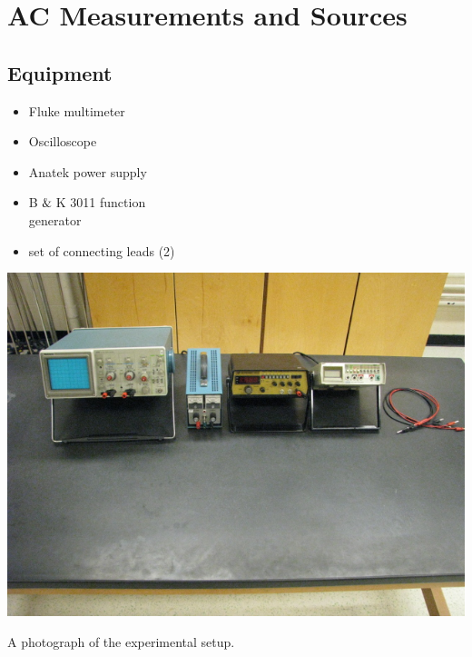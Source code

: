 




\chapter{AC Measurements and Sources}

\section{{\bf Equipment}}

\begin{minipage}[t]{0.55\textwidth}
\begin{itemize}[noitemsep]
\item Fluke multimeter
\item Oscilloscope
\item Anatek power supply
\end{itemize}
\end{minipage}
\begin{minipage}[t]{0.45\textwidth}
\begin{itemize}[noitemsep]
\item B$\And$K 3011 function \\generator
\item set of connecting leads (2)
\end{itemize}
\end{minipage}

\begin{marginfigure}
\includegraphics{AC-Measurements-Setup.jpg}
\caption{A photograph of the experimental setup.}
\label{fig:ACsetup}
\end{marginfigure}

